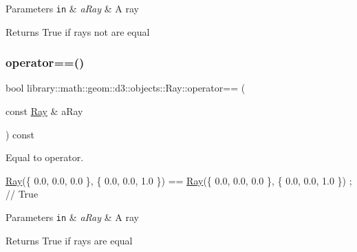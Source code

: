 \begin{DoxyParams}[1]{Parameters}
\mbox{\tt in}  & {\em a\+Ray} & A ray \\
\hline
\end{DoxyParams}
\begin{DoxyReturn}{Returns}
True if rays not are equal 
\end{DoxyReturn}
\mbox{\label{classlibrary_1_1math_1_1geom_1_1d3_1_1objects_1_1_ray_a90dbc4baa23e5f74b26b566bb862592f}} 
\subsubsection{\texorpdfstring{operator==()}{operator==()}}
{\footnotesize\ttfamily bool library\+::math\+::geom\+::d3\+::objects\+::\+Ray\+::operator== (\begin{DoxyParamCaption}\item[{const \hyperlink{classlibrary_1_1math_1_1geom_1_1d3_1_1objects_1_1_ray}{Ray} \&}]{a\+Ray }\end{DoxyParamCaption}) const}



Equal to operator. 


\begin{DoxyCode}
\hyperlink{classlibrary_1_1math_1_1geom_1_1d3_1_1objects_1_1_ray_a11b7613464daaebc6e25a758b057f203}{Ray}(\{ 0.0, 0.0, 0.0 \}, \{ 0.0, 0.0, 1.0 \}) == \hyperlink{classlibrary_1_1math_1_1geom_1_1d3_1_1objects_1_1_ray_a11b7613464daaebc6e25a758b057f203}{Ray}(\{ 0.0, 0.0, 0.0 \}, \{ 0.0, 0.0, 1.0 \}) ; \textcolor{comment}{// True}
\end{DoxyCode}



\begin{DoxyParams}[1]{Parameters}
\mbox{\tt in}  & {\em a\+Ray} & A ray \\
\hline
\end{DoxyParams}
\begin{DoxyReturn}{Returns}
True if rays are equal 
\end{DoxyReturn}
\mbox{\label{classlibrary_1_1math_1_1geom_1_1d3_1_1objects_1_1_ray_a2140183dca4c36f5c51ed9e8f2cd220d}} 
